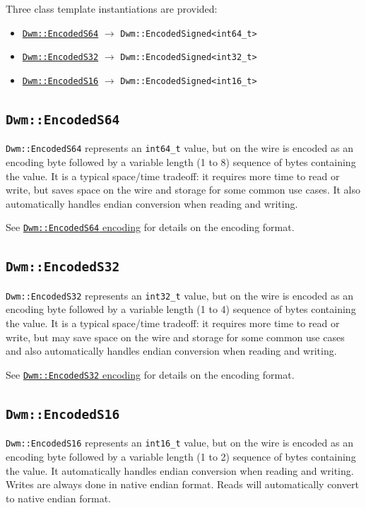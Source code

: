 Three class template instantiations are provided:
\vspace{1ex}

\begin{itemize}[noitemsep,nolistsep]
\item[] \hyperref[class:EncodedS64]{\texttt{Dwm::EncodedS64}} $\rightarrow$ \texttt{Dwm::EncodedSigned<int64\_t>}
\item[] \hyperref[class:EncodedS32]{\texttt{Dwm::EncodedS32}} $\rightarrow$ \texttt{Dwm::EncodedSigned<int32\_t>}
\item[] \hyperref[class:EncodedS16]{\texttt{Dwm::EncodedS16}} $\rightarrow$ \texttt{Dwm::EncodedSigned<int16\_t>}
\end{itemize}

\subsection{\texttt{Dwm::EncodedS64}}\label{class:EncodedS64}
\texttt{Dwm::EncodedS64} represents an \texttt{int64\_t} value, but
on the wire is encoded as an encoding byte followed by a variable
length (1 to 8) sequence of bytes containing the value.  It is a
typical space/time tradeoff: it requires more time to read or write,
but saves space on the wire and storage for some common use cases.
It also automatically handles endian conversion when reading and
writing.

See \hyperref[encoding:DwmEncodedS64]{\texttt{Dwm::EncodedS64}
 encoding} for details on the encoding format.

\subsection{\texttt{Dwm::EncodedS32}}\label{class:EncodedS32}
\texttt{Dwm::EncodedS32} represents an \texttt{int32\_t} value, but
on the wire is encoded as an encoding byte followed by a variable
length (1 to 4) sequence of bytes containing the value.  It is a
typical space/time tradeoff: it requires more time to read or write,
but may save space on the wire and storage for some common use cases
and also automatically handles endian conversion when reading and
writing.

See \hyperref[encoding:DwmEncodedS32]{\texttt{Dwm::EncodedS32}
 encoding} for details on the encoding format.

\subsection{\texttt{Dwm::EncodedS16}}\label{class:EncodedS16}
\texttt{Dwm::EncodedS16} represents an \texttt{int16\_t} value, but on
the wire is encoded as an encoding byte followed by a variable length
(1 to 2) sequence of bytes containing the value.  It automatically
handles endian conversion when reading and writing.  Writes are always
done in native endian format.  Reads will automatically convert to
native endian format.

